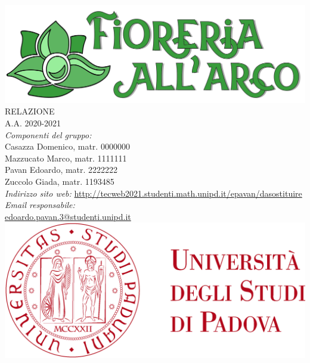 \thispagestyle{empty}
\begin{titlepage}
	\begin{center}
		
		\includegraphics[scale = 0.05]{../latex/images/logotitle.png}\\[1.5cm]
\Huge \textsc{RELAZIONE \doctitle{}}\\ [0.75cm]                          
\Large \textsf{A.A. 2020-2021} \\ [1cm]
		

\Large \textsl{Componenti del gruppo:} \\[0.25cm] \textsf{Casazza Domenico, matr. 0000000} \\ [0.1cm]
\Large \textsf{Mazzucato Marco, matr. 1111111} \\ [0.1cm]
\Large \textsf{Pavan Edoardo, matr. 2222222} \\ [0.1cm]
\Large \textsf{Zuccolo Giada, matr. 1193485} \\ [1.75cm]
                
\Large \textsl{Indirizzo sito web:}  \textsf{\href{http://tecweb2021.studenti.math.unipd.it/epavan/dasostituire}{http://tecweb2021.studenti.math.unipd.it/epavan/dasostituire}}\\[0.25cm]
\Large \textsl{Email responsabile:}\\ 
\textsf{\href{edoardo.pavan.3@studenti.unipd.it}{edoardo.pavan.3@studenti.unipd.it}}\\[1cm]

		\includegraphics[scale = 0.055]{../latex/images/logoUniPD.png}


	\end{center}
\end{titlepage}